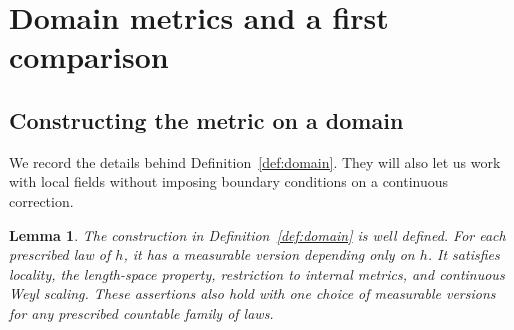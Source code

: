 \documentclass[11pt]{article}
\newtheorem{lemma}[theorem]{Lemma}
\theoremstyle{definition}
\theoremstyle{remark}
\begin{document}
\section{Domain metrics and a first comparison}
\subsection{Constructing the metric on a domain}\label{sec:domain}
We record the details behind Definition~\ref{def:domain}. They will
also let us work with local fields without imposing boundary
conditions on a continuous correction.

\begin{lemma}\label{lem:domain}
The construction in Definition~\ref{def:domain} is well defined.
For each prescribed law of $h$, it has a measurable version depending
only on $h$. It satisfies locality, the length-space property,
restriction to internal metrics, and continuous Weyl scaling.
These assertions also hold with one choice of measurable versions
for any prescribed countable family of laws.
\end{lemma}
\end{document}
